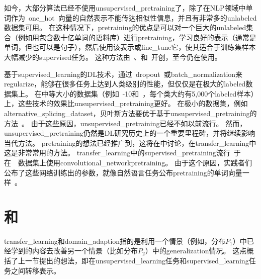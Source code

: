 如今，大部分算法已经不使用\gls{unsupervised_pretraining}了，除了在\gls{NLP}领域中单词作为~\gls{one_hot}~向量的自然表示不能传达相似性信息，并且有非常多的\gls{unlabeled}数据集可用。
在这种情况下，\gls{pretraining}的优点是可以对一个巨大的\gls{unlabeled}集合（例如用包含数十亿单词的语料库）进行\gls{pretraining}，学习良好的表示（通常是单词，但也可以是句子），然后使用该表示或\gls{fine_tune}它，使其适合于训练集样本大幅减少的\gls{supervised}任务。
这种方法由~\cite{CollobertR2008-small}、\cite{Turian+Ratinov+Bengio-2010-small}和~\cite{collobert2011natural}开创，至今仍在使用。



基于\gls{supervised_learning}的\gls{DL}技术，通过~\gls{dropout}~或\gls{batch_normalization}来\gls{regularize}，能够在很多任务上达到人类级别的性能，但仅仅是在极大的\gls{labeled}数据集上。
在中等大小的数据集（例如~-10和~，每个类大约有5,000个\gls{labeled}样本）上，这些技术的效果比\gls{unsupervised_pretraining}更好。
在极小的数据集，例如\gls{alternative_splicing_dataset}，贝叶斯方法要优于基于\gls{unsupervised_pretraining}的方法~\citep{Srivastava-master-small}。
由于这些原因，\gls{unsupervised_pretraining}已经不如以前流行。
然而，\gls{unsupervised_pretraining}仍然是\gls{DL}研究历史上的一个重要里程碑，并将继续影响当代方法。
\gls{pretraining}的想法已经推广到，这将在中讨论，在\gls{transfer_learning}中这是非常常用的方法。
\gls{transfer_learning}中的\gls{supervised_pretraining}流行~\citep{Oquab-et-al-CVPR2014,yosinski-nips2014}于在~~数据集上使用\gls{convolutional_network}\gls{pretraining}。
由于这个原因，实践者们公布了这些网络训练出的参数，就像自然语言任务公布\gls{pretraining}的单词向量一样~\citep{collobert2011natural,Mikolov-et-al-ICLR2013}。


\section{和}
\label{sec:transfer_learning_and_domain_adaptation}
\gls{transfer_learning}和\gls{domain_adaption}指的是利用一个情景（例如，分布$P_1$）中已经学到的内容去改善另一个情景（比如分布$P_2$）中的\gls{generalization}情况。
这点概括了上一节提出的想法，即在\gls{unsupervised_learning}任务和\gls{supervised_learning}任务之间转移表示。


